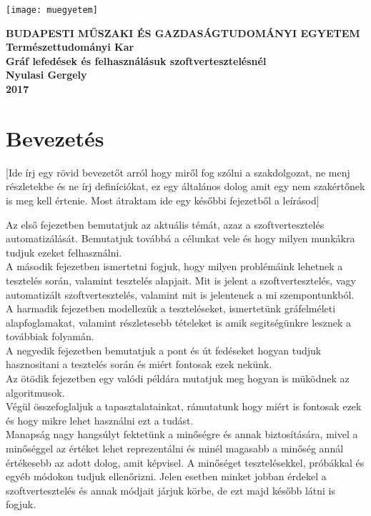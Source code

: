 \documentclass[12pt]{article}
\begin{document}
\begin{titlepage}
\centering
\texttt{[image: muegyetem]}

\bfseries\small{
BUDAPESTI MŰSZAKI ÉS GAZDASÁGTUDOMÁNYI EGYETEM
}\\
Természettudományi Kar\\
\vfill
\Large{Gráf lefedések és felhasználásuk szoftvertesztelésnél}\\
Nyulasi Gergely\\

\vfill
\vfill
2017
\end{titlepage}

\pagebreak

\tableofcontents

\pagebreak

\section{Bevezetés}
[Ide írj egy rövid bevezetőt arról hogy miről fog szólni a szakdolgozat, ne menj részletekbe és ne írj definíciókat, ez egy általános dolog amit egy nem szakértőnek is meg kell értenie. Most átraktam ide egy későbbi fejezetből a leírásod]

Az első fejezetben bemutatjuk az aktuális témát, azaz a szoftvertesztelés automatizálását. Bemutatjuk továbbá a célunkat vele és hogy milyen munkákra tudjuk ezeket felhasználni.\\
A második fejezetben ismertetni fogjuk, hogy milyen problémáink lehetnek a tesztelés során, valamint tesztelés alapjait.
 Mit is jelent a szoftvertesztelés, vagy automatizált szoftvertesztelés, valamint mit is jelentenek a mi szempontunkból.\\
A harmadik fejezetben modellezük a teszteléseket, ismertetünk gráfelméleti alapfoglamakat, valamint részletesebb tételeket is amik segitségünkre lesznek a továbbiak folyamán.\\
A negyedik fejezetben bemutatjuk a pont és út fedéseket hogyan tudjuk hasznositani a tesztelés során és miért fontosak ezek nekünk.\\
Az ötödik fejezetben egy valódi példára mutatjuk meg hogyan is müködnek az algoritmusok.\\
Végül összefoglaljuk a tapasztalatainkat, rámutatunk hogy miért is fontosak ezek és hogy mikre lehet használni ezt a tudást.\\


Manapság nagy hangsúlyt fektetünk a minőségre és annak biztosítására, mivel a minőséggel az értéket lehet reprezentálni és minél magasabb a minőség annál értékesebb az adott dolog, amit képvisel. A minőséget tesztelésekkel, próbákkal és egyéb módokon tudjuk ellenőrizni.
Jelen esetben minket jobban érdekel a szoftvertesztelés és annak módjait járjuk körbe, de ezt majd később látni is fogjuk.\\
\end{document}
